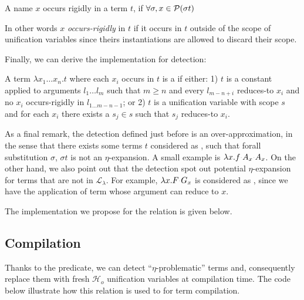 \documentclass[sigconf,natbib=false,review]{acmart}
\newcommand{\appsep}{\ensuremath{\textcolor{lightgray}{\cdot}}}
\newcommand{\llambda}{\ensuremath{\mathcal{L}_\lambda}\xspace}
\newcommand{\Ho}{\ensuremath{\mathcal{H}_o}\xspace}
\begin{document}
\begin{definition}
  A name $x$ occurs rigidly in a term $t$, if $\forall \sigma, x \in
  \mathcal{P}(\sigma t)$
\end{definition}
In other words $x$ \emph{occurs-rigidly} in $t$ if it occurs in $t$
outside of the scope of unification variables since theirs instantiations
are allowed to discard their scope.

Finally, we can derive the implementation for \maybeeta detection:

\begin{definition}
  A term $\lambda x_1 \ldots x_n.t$ where each $x_i$ occurs in $t$ is a
  \maybeeta if
  either: 1) $t$ is a constant applied to arguments
  $l_1 \ldots l_m$ such that 
  $m \geq n$ and every $l_{m-n+i}$ reduces-to $x_i$ and
  no $x_i$ occurs-rigidly in $l_{1\ldots m-n-1}$; or 2) $t$ is a
  unification variable with scope $s$ and
  for each $x_i$ there exists a $s_j \in s$ such that $s_j$ reduces-to $x_i$.
\end{definition}

As a final remark, the \maybeeta detection defined just before is an
over-approximation, in the sense that there exists some terms $t$ considered as
\maybeeta, such that forall substitution $\sigma$, $\sigma t$ is not an
$\eta$-expansion. A small example is $\lambda x. f \appsep A_x \appsep A_x$. On
the other hand, we also point out that the \maybeeta detection spot out
potential $\eta$-expansion for terms that are not in \llambda. For example,
$\lambda x.F \appsep G_x$ is considered as \maybeeta, since we have the
application of term whose argument can reduce to $x$.

The implementation we propose for the \maybeeta relation is given below.




\subsection{Compilation}

Thanks to the  predicate, we can detect ``$\eta$-problematic''
terms and, consequently replace them with fresh \Ho unification variables at
compilation time. The code below illustrate how this relation is used to for
term compilation.
\end{document}
